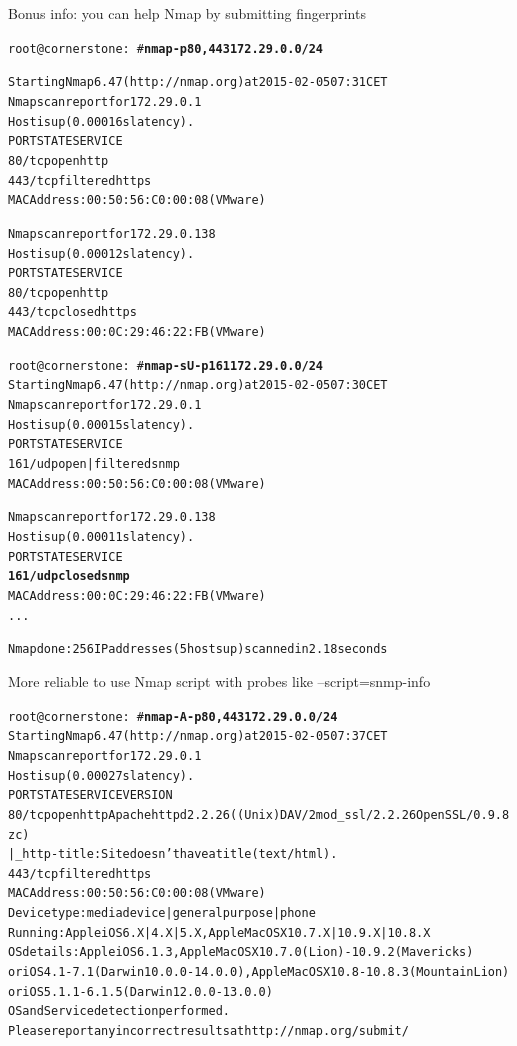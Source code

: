 \documentclass[Screen16to9,17pt]{foils}
\begin{document}
Bonus info: you can help Nmap by submitting fingerprints



\begin{alltt}\small
root@cornerstone:~#{\bfseries  nmap -p80,443 172.29.0.0/24}

Starting Nmap 6.47 ( http://nmap.org ) at 2015-02-05 07:31 CET
Nmap scan report for 172.29.0.1
Host is up (0.00016s latency).
PORT    STATE    SERVICE
{\color{darkgreen}80/tcp  open     http}
443/tcp filtered https
MAC Address: 00:50:56:C0:00:08 (VMware)

Nmap scan report for 172.29.0.138
Host is up (0.00012s latency).
PORT    STATE  SERVICE
{\color{darkgreen}80/tcp  open   http}
443/tcp closed https
MAC Address: 00:0C:29:46:22:FB (VMware)

\end{alltt}


\begin{alltt}\small
root@cornerstone:~#{\bfseries nmap -sU -p 161 172.29.0.0/24}
Starting Nmap 6.47 ( http://nmap.org ) at 2015-02-05 07:30 CET
Nmap scan report for 172.29.0.1
Host is up (0.00015s latency).
PORT    STATE         SERVICE
{\color{darkgreen}161/udp open|filtered snmp}
MAC Address: 00:50:56:C0:00:08 (VMware)

Nmap scan report for 172.29.0.138
Host is up (0.00011s latency).
PORT    STATE  SERVICE
{\bf{161/udp closed snmp}}
MAC Address: 00:0C:29:46:22:FB (VMware)
...

Nmap done: 256 IP addresses (5 hosts up) scanned in 2.18 seconds
\end{alltt}

\vskip 5mm
\centerline{More reliable to use Nmap script with probes like --script=snmp-info}

\begin{alltt}\footnotesize
root@cornerstone:~#{\bfseries nmap -A -p80,443 172.29.0.0/24}
Starting Nmap 6.47 ( http://nmap.org ) at 2015-02-05 07:37 CET
Nmap scan report for 172.29.0.1
Host is up (0.00027s latency).
PORT    STATE    SERVICE VERSION
80/tcp  open     http    Apache httpd 2.2.26 ((Unix) DAV/2 mod_ssl/2.2.26 OpenSSL/0.9.8zc)
|_http-title: Site doesn't have a title (text/html).
443/tcp filtered https
MAC Address: 00:50:56:C0:00:08 (VMware)
Device type: media device|general purpose|phone
Running: Apple iOS 6.X|4.X|5.X, Apple Mac OS X 10.7.X|10.9.X|10.8.X
OS details: Apple iOS 6.1.3, Apple Mac OS X 10.7.0 (Lion) - 10.9.2 (Mavericks)
or iOS 4.1 - 7.1 (Darwin 10.0.0 - 14.0.0), Apple Mac OS X 10.8 - 10.8.3 (Mountain Lion)
or iOS 5.1.1 - 6.1.5 (Darwin 12.0.0 - 13.0.0)
OS and Service detection performed.
Please report any incorrect results at http://nmap.org/submit/
\end{alltt}
\end{document}
